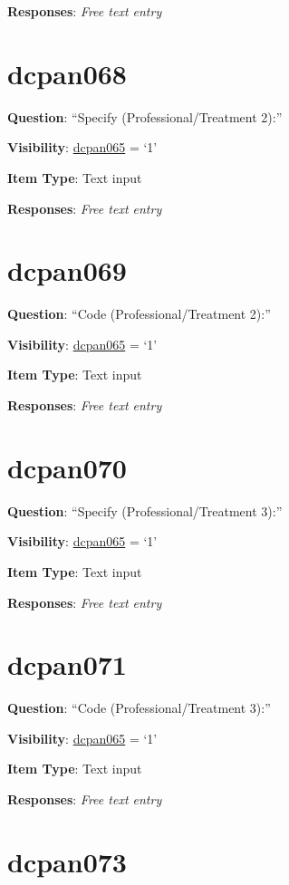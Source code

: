 \documentclass[]{book}
\begin{document}
\textbf{Responses}: \emph{Free text entry}

\hypertarget{dcpan068}{%
\section{dcpan068}\label{dcpan068}}

\textbf{Question}: ``Specify (Professional/Treatment 2):''

\textbf{Visibility}: \protect\hyperlink{dcpan065}{dcpan065} = `1'

\textbf{Item Type}: Text input

\textbf{Responses}: \emph{Free text entry}

\hypertarget{dcpan069}{%
\section{dcpan069}\label{dcpan069}}

\textbf{Question}: ``Code (Professional/Treatment 2):''

\textbf{Visibility}: \protect\hyperlink{dcpan065}{dcpan065} = `1'

\textbf{Item Type}: Text input

\textbf{Responses}: \emph{Free text entry}

\hypertarget{dcpan070}{%
\section{dcpan070}\label{dcpan070}}

\textbf{Question}: ``Specify (Professional/Treatment 3):''

\textbf{Visibility}: \protect\hyperlink{dcpan065}{dcpan065} = `1'

\textbf{Item Type}: Text input

\textbf{Responses}: \emph{Free text entry}

\hypertarget{dcpan071}{%
\section{dcpan071}\label{dcpan071}}

\textbf{Question}: ``Code (Professional/Treatment 3):''

\textbf{Visibility}: \protect\hyperlink{dcpan065}{dcpan065} = `1'

\textbf{Item Type}: Text input

\textbf{Responses}: \emph{Free text entry}

\hypertarget{dcpan073}{%
\section{dcpan073}\label{dcpan073}}
\end{document}
